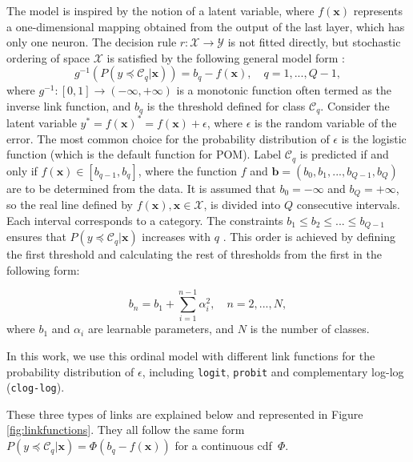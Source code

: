 \documentclass[journal]{IEEEtran}
\begin{document}
	The model is inspired by the notion of a latent variable, where $f(\textbf{x})$ represents a one-dimensional mapping obtained from the output of the last layer, which has only one neuron. The decision rule $r: \mathcal{X} \rightarrow \mathcal{Y}$ is not fitted directly, but stochastic ordering of space $\mathcal{X}$ is satisfied by the following general model form \cite{herbrich2000large}:
	\begin{equation}
		g^{-1}(P(y \preceq \mathcal{C}_q | \mathbf{x})) = b_q - f(\mathbf{x}), \quad q = 1, ..., Q-1,
	\end{equation}
	where $g^{-1} : [0,1] \rightarrow (-\infty, +\infty)$ is a monotonic function often termed as the inverse link function, and $b_q$ is the threshold defined for class $\mathcal{C}_q$. Consider the latent variable $y^* = f(\mathbf{x})^* = f(\mathbf{x}) + \epsilon$, where $\epsilon$ is the random variable of the error. The most common choice for the probability distribution of $\epsilon$ is the logistic function (which is the default function for POM). Label $\mathcal{C}_q$ is predicted if and only if $f(\mathbf{x}) \in [b_{q-1}, b_q]$, where the function $f$ and $\mathbf{b} = (b_0, b_1, ..., b_{Q-1}, b_Q)$ are to be determined from the data. It is assumed that $b_0 = -\infty$ and $b_Q = +\infty$, so the real line defined by $f(\textbf{x}), \textbf{x} \in \mathcal{X}$, is divided into $Q$ consecutive intervals. Each interval corresponds to a category. The constraints $b_1 \le b_2 \le ... \le b_{Q-1}$ ensures that $P(y \preceq \mathcal{C}_q | \mathbf{x})$ increases with $q$ \cite{mccullagh1980regression}.
	This order is achieved by defining the first threshold and calculating the rest of thresholds from the first in the following form:
	
	\begin{equation}
	b_n = b_1 + \sum_{i=1}^{n-1} \alpha_i^2, \quad n = 2, ..., N,
	\end{equation}
	where $b_1$ and $\alpha_i$ are learnable parameters, and $N$ is the number of classes.
	
	In this work, we use this ordinal model with different link functions for the probability distribution of $\epsilon$, including \texttt{logit}, \texttt{probit} and complementary log-log (\texttt{clog-log}).
	
	These three types of links are explained below and represented in Figure \ref{fig:linkfunctions}. They all follow the same form $P(y \preceq \mathcal{C}_q | \mathbf{x}) = \Phi(b_q - f(\mathbf{x}))$ for a continuous cdf~$\Phi$.
			
\end{document}
